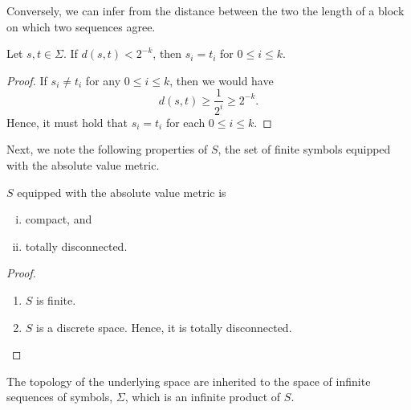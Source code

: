 \documentclass[10pt,twoside]{book}
\begin{document}
Conversely, we can infer from the distance between the two the length of a block on which two sequences agree.
\begin{proposition}
  Let $s, t \in \Sigma$.
  If $d(s,t) < 2^{-k}$, then $s_i = t_i$ for $0 \leq i \leq k$.
  \label{prop:symbol-bound2}
  \begin{proof}
    If $s_i \neq t_i$ for any $0 \leq i \leq k$, then we would have
    \begin{equation*}
      d(s,t) \geq \frac{1}{2^i} \geq 2^{-k}.
    \end{equation*}
    Hence, it must hold that $s_i = t_i$ for each $0 \leq i \leq k$.
  \end{proof}
\end{proposition}
Next, we note the following properties of $S$, the set of finite symbols equipped with the absolute value metric.
\begin{proposition}
  $S$ equipped with the absolute value metric is 
  \begin{enumerate}[(i)]
    \item compact, and
    \item totally disconnected.
  \end{enumerate}
  \begin{proof}
    \begin{enumerate}
      \item
        $S$ is finite.
      \item 
        $S$ is a discrete space.
        Hence, it is totally disconnected.
    \end{enumerate}
  \end{proof}
\end{proposition}
The topology of the underlying space are inherited to the space of infinite sequences of symbols, $\Sigma$, which is an infinite product of $S$.
\end{document}
